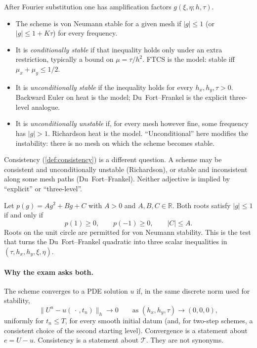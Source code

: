 \begin{definition}
\label{def:cond-uncond}
After Fourier substitution one has amplification factors \(g(\xi,\eta;h,\tau)\).
\begin{itemize}
    \item The scheme is von Neumann stable for a given mesh if \(|g|\le 1\) (or \(|g|\le 1+K\tau\)) for every frequency.
    \item It is \emph{conditionally stable} if that inequality holds only under an extra restriction, typically a bound on \(\mu=\tau/h^2\). FTCS is the model: stable iff \(\mu_x+\mu_y\le 1/2\).
    \item It is \emph{unconditionally stable} if the inequality holds for every \(h_x,h_y,\tau>0\). Backward Euler on heat is the model; Du~Fort--Frankel is the explicit three-level analogue.
    \item It is \emph{unconditionally unstable} if, for every mesh however fine, some frequency has \(|g|>1\). Richardson heat is the model. ``Unconditional'' here modifies the instability: there is no mesh on which the scheme becomes stable.
\end{itemize}
Consistency (\cref{def:consistency}) is a different question. A scheme may be consistent and unconditionally unstable (Richardson), or stable and inconsistent along some mesh paths (Du~Fort--Frankel). Neither adjective is implied by ``explicit'' or ``three-level''.
\end{definition}

\begin{proposition}
\label{prop:jury}
Let \(p(g)=Ag^2+Bg+C\) with \(A>0\) and \(A,B,C\in\mathbb R\). Both roots satisfy \(|g|\le 1\) if and only if
\[
p(1)\ge 0,
\qquad
p(-1)\ge 0,
\qquad
|C|\le A.
\]
Roots on the unit circle are permitted for von Neumann stability. This is the test that turns the Du~Fort--Frankel quadratic into three scalar inequalities in \((\tau,h_x,h_y,\xi,\eta)\).
\end{proposition}

\paragraph{Why the exam asks both.}

\begin{definition}[Convergence]
\label{def:convergence}
The scheme converges to a PDE solution \(u\) if, in the same discrete norm used for stability,
\[
\|U^n-u(\,\cdot\,,t_n)\|_h
\to
0
\qquad
\text{as }
(h_x,h_y,\tau)\to(0,0,0),
\]
uniformly for \(t_n\le T\), for every smooth initial datum (and, for two-step schemes, a consistent choice of the second starting level). Convergence is a statement about \(e=U-u\). Consistency is a statement about \(\mathcal T\). They are not synonyms.
\end{definition}

